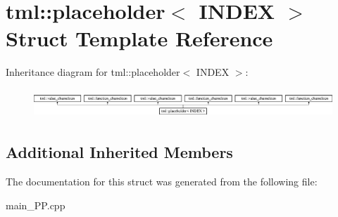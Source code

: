 \hypertarget{structtml_1_1placeholder}{\section{tml\+:\+:placeholder$<$ I\+N\+D\+E\+X $>$ Struct Template Reference}
\label{structtml_1_1placeholder}
}
Inheritance diagram for tml\+:\+:placeholder$<$ I\+N\+D\+E\+X $>$\+:\begin{figure}[H]
\begin{center}
\leavevmode
\includegraphics[height=1.098039cm]{structtml_1_1placeholder}
\end{center}
\end{figure}
\subsection*{Additional Inherited Members}


The documentation for this struct was generated from the following file\+:\begin{DoxyCompactItemize}
\item 
main\+\_\+\+P\+P.\+cpp\end{DoxyCompactItemize}
